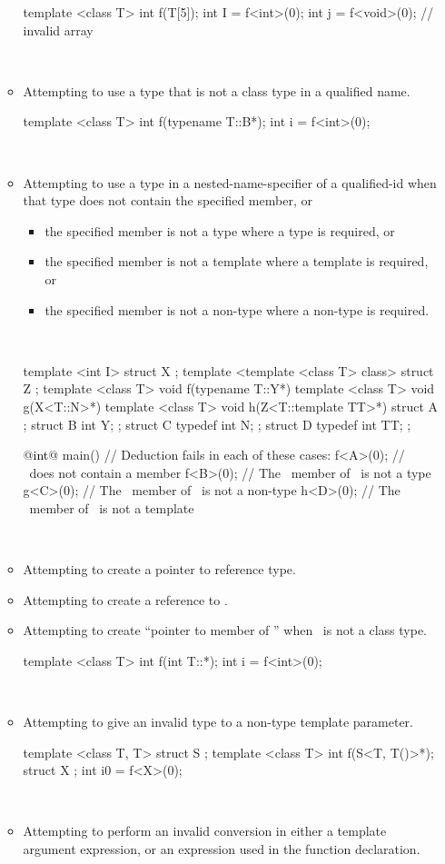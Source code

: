 \documentclass[american]{book}
\begin{document}
\begin{paras}
\begin{itemize}
\begin{itemize}
\begin{codeblock}
template <class T> int f(T[5]);
int I = f<int>(0);
int j = f<void>(0);             // invalid array
\end{codeblock}
\exitexample\ 
\item
Attempting to use a type that is not a class type in a qualified name.
\enterexample\ 

\begin{codeblock}
template <class T> int f(typename T::B*);
int i = f<int>(0);
\end{codeblock}
\exitexample\ 
\item
Attempting to use a type in a nested-name-specifier of a qualified-id when
that type does not contain the specified member, or
\begin{itemize}
\item
the specified member is not a type where a type is required, or
\item
the specified member is not a template where a template is required, or
\item
the specified member is not a non-type where a non-type is
required.
\end{itemize}
\enterexample\ 

\begin{codeblock}
template <int I> struct X { };
template <template <class T> class> struct Z { };
template <class T> void f(typename T::Y*){}
template <class T> void g(X<T::N>*){}
template <class T> void h(Z<T::template TT>*){}
struct A {};
struct B { int Y; };
struct C {
    typedef int N;
};
struct D {
    typedef int TT;
};

@\textcolor{black}{int}@ main()
{
    // Deduction fails in each of these cases:
    f<A>(0);  // \ does not contain a member 
    f<B>(0);  // The \tcode{Y}\ member of \ is not a type
    g<C>(0);  // The \tcode{N}\ member of \tcode{C}\ is not a non-type
    h<D>(0);  // The \tcode{TT}\ member of \tcode{D}\ is not a template
}
\end{codeblock}
\exitexample\ 
\item
Attempting to create a pointer to reference type.
\item
Attempting to create a reference to \tcode{void}.
\item
Attempting to create ``pointer to member of \tcode{T}'' when \tcode{T}\ is not a
class type.
\enterexample\ 

\begin{codeblock}
template <class T> int f(int T::*);
int i = f<int>(0);
\end{codeblock}
\exitexample\ 
\item
Attempting to give an invalid type to a non-type template parameter.
\enterexample\
\begin{codeblock}
template <class T, T> struct S {};
template <class T> int f(S<T, T()>*);
struct X {};
int i0 = f<X>(0);
\end{codeblock}
\exitexample\
\item
Attempting to perform an invalid conversion in either a template
argument expression, or an expression used in the function
declaration.
\enterexample\ 


\end{itemize}
\end{itemize}
\end{paras}
\end{document}
